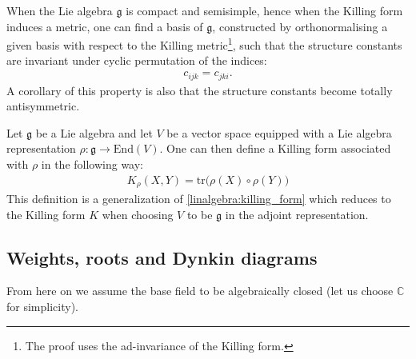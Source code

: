     \begin{property}
        When the Lie algebra $\mathfrak{g}$ is compact and semisimple, hence when the Killing form induces a metric, one can find a basis of $\mathfrak{g}$, constructed by orthonormalising a given basis with respect to the Killing metric\footnote{The proof uses the ad-invariance of the Killing form.}, such that the structure constants are invariant under cyclic permutation of the indices:
        \begin{gather}
            c_{ijk} = c_{jki}.
        \end{gather}
        A corollary of this property is also that the structure constants become totally antisymmetric.
    \end{property}

    \begin{construct}
        Let $\mathfrak{g}$ be a Lie algebra and let $V$ be a vector space equipped with a Lie algebra representation $\rho:\mathfrak{g}\rightarrow\text{End}(V)$. One can then define a Killing form associated with $\rho$ in the following way:
        \begin{gather}
            \label{lie:rho_killing_form}
            K_\rho(X, Y) = \text{tr}\Big(\rho(X)\circ\rho(Y)\Big)
        \end{gather}
        This definition is a generalization of \ref{linalgebra:killing_form} which reduces to the Killing form $K$ when choosing $V$ to be $\mathfrak{g}$ in the adjoint representation.
    \end{construct}

\subsection{Weights, roots and Dynkin diagrams}

    From here on we assume the base field to be algebraically closed (let us choose $\mathbb{C}$ for simplicity).


